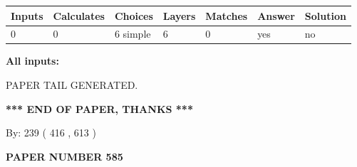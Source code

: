\documentclass[12pt]{article}
\begin{document}
 
\noindent{}
 
 
   
   
   
   
\noindent\begin{tabular}{|l|l|l|l|l|l|l|}
 \hline
Inputs & Calculates & Choices & Layers & Matches & Answer & Solution \\ \hline
 0  & 
 0  & 
 6
  simple  
  & 
 6  & 
 0  & 
  yes & 
  no 
  \\ \hline
 \end{tabular}
   
   
   
   
\noindent{}
   
   
   
   
\noindent\vspace{0.1in}\hspace{-0.08in} {\textbf{\Large{All inputs: }}}
   
   
   
   
   
   
 \vspace{0.2in}
 
   
   
\vspace{2.0in} PAPER TAIL GENERATED.
   
   
   
   
\vspace{1.0in} 
{\textbf{\large{ *** END OF PAPER, THANKS *** }}} 
   
   
\hspace{1.0in} By: 
 239 ( 416 ,  613 )
   
   
   
   
\newpage 
\setcounter{page}{ 
   585001 } 
   
   
   
   
 {\textbf{ \Large{ PAPER NUMBER  585  }}}
   
   
\vspace{0.2in}
   
   
   
   
   
   
   
   
 \vspace{0.2in}
 
\end{document}
